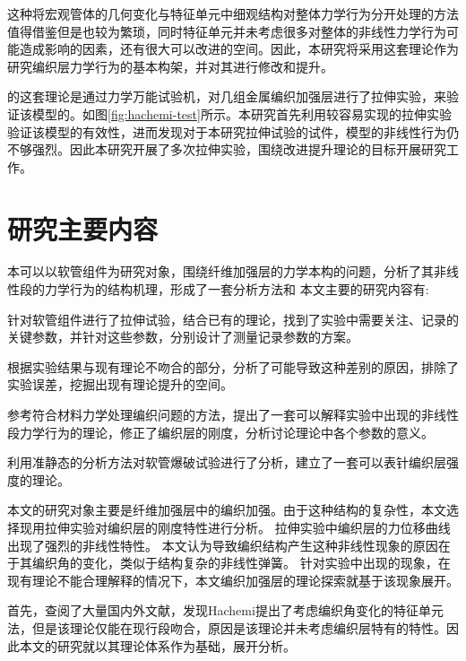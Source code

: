   这种将宏观管体的几何变化与特征单元中细观结构对整体力学行为分开处理的方法值得借鉴但是也较为繁琐，同时\ha 特征单元并未考虑很多对整体的非线性力学行为可能造成影响的因素，还有很大可以改进的空间。因此，本研究将采用这套理论作为研究编织层力学行为的基本构架，并对其进行修改和提升。
 
\citeauthor{Hachemi2011}的这套理论是通过力学万能试验机，对几组金属编织加强层进行了拉伸实验，来验证该模型的。如图\ref{fig:hachemi-test}所示。本研究首先利用较容易实现的拉伸实验验证该模型的有效性，进而发现对于本研究拉伸试验的试件，\ha 模型的非线性行为仍不够强烈。因此本研究开展了多次拉伸实验，围绕改进提升\ha 理论的目标开展研究工作。




 











\section{研究主要内容}
本可以以软管组件为研究对象，围绕纤维加强层的力学本构的问题，分析了其非线性段的力学行为的结构机理，形成了一套分析方法和
本文主要的研究内容有:
\begin{asparaenum}
	\item 针对软管组件进行了拉伸试验，结合已有的理论，找到了实验中需要关注、记录的关键参数，并针对这些参数，分别设计了测量记录参数的方案。
	\item 根据实验结果与现有理论不吻合的部分，分析了可能导致这种差别的原因，排除了实验误差，挖掘出现有理论提升的空间。
	\item 参考符合材料力学处理编织问题的方法，提出了一套可以解释实验中出现的非线性段力学行为的理论，修正了编织层的刚度，分析讨论理论中各个参数的意义。
	 \item 
	利用准静态的分析方法对软管爆破试验进行了分析，建立了一套可以表针编织层强度的理论。
\end{asparaenum}

本文的研究对象主要是纤维加强层中的编织加强。由于这种结构的复杂性，本文选择现用拉伸实验对编织层的刚度特性进行分析。
拉伸实验中编织层的力位移曲线出现了强烈的非线性特性。
本文认为导致编织结构产生这种非线性现象的原因在于其编织角的变化，类似于结构复杂的非线性弹簧。
针对实验中出现的现象，在现有理论不能合理解释的情况下，本文编织加强层的理论探索就基于该现象展开。


首先，查阅了大量国内外文献，发现Hachemi提出了考虑编织角变化的特征单元法，但是该理论仅能在现行段吻合，原因是该理论并未考虑编织层特有的特性。因此本文的研究就以其理论体系作为基础，展开分析。

